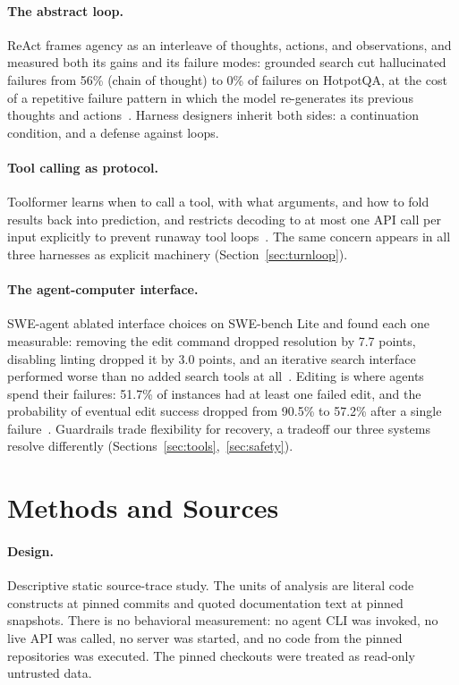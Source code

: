 \documentclass{article}
\begin{document}
\paragraph{The abstract loop.} ReAct frames agency as an interleave of
thoughts, actions, and observations, and measured both its gains and its
failure modes: grounded search cut hallucinated failures from 56\% (chain
of thought) to 0\% of failures on HotpotQA, at the cost of a repetitive
failure pattern in which the model re-generates its previous thoughts and
actions~\citep{yao2023react}. Harness designers inherit both sides: a
continuation condition, and a defense against loops.

\paragraph{Tool calling as protocol.} Toolformer learns when to call a tool,
with what arguments, and how to fold results back into prediction, and
restricts decoding to at most one API call per input explicitly to prevent
runaway tool loops~\citep{schick2023toolformer}. The same concern appears in
all three harnesses as explicit machinery (Section~\ref{sec:turnloop}).

\paragraph{The agent-computer interface.} SWE-agent ablated interface
choices on SWE-bench Lite and found each one measurable: removing the edit
command dropped resolution by 7.7 points, disabling linting dropped it by
3.0 points, and an iterative search interface performed worse than no added
search tools at all~\citep{yang2024sweagent}. Editing is where agents spend
their failures: 51.7\% of instances had at least one failed edit, and the
probability of eventual edit success dropped from 90.5\% to 57.2\% after a
single failure~\citep{yang2024sweagent}. Guardrails trade flexibility for
recovery, a tradeoff our three systems resolve differently
(Sections~\ref{sec:tools},~\ref{sec:safety}).

\section{Methods and Sources}
\label{sec:methods}

\paragraph{Design.} Descriptive static source-trace study. The units of
analysis are literal code constructs at pinned commits and quoted
documentation text at pinned snapshots. There is no behavioral measurement:
no agent CLI was invoked, no live API was called, no server was started,
and no code from the pinned repositories was executed. The pinned checkouts
were treated as read-only untrusted data.
\end{document}
